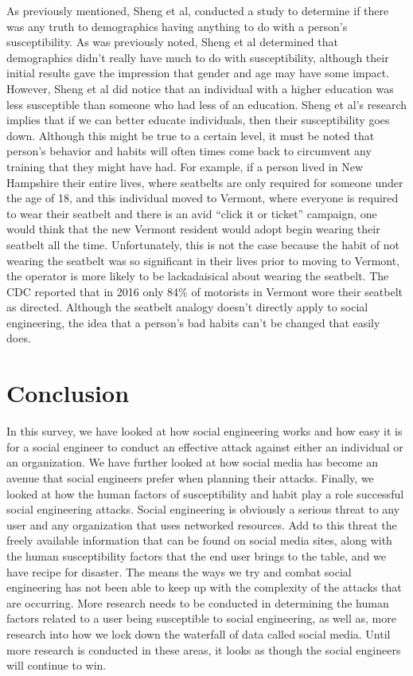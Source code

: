 \documentclass[conference]{IEEEtran}
\begin{document}
As previously mentioned, Sheng et al, conducted a study to determine if there was any truth to demographics having anything to do with a person's susceptibility. As was previously noted, Sheng et al determined that demographics didn't really have much to do with susceptibility, although their initial results gave the impression that gender and age may have some impact.  However, Sheng et al did notice that an individual with a higher education was less susceptible than someone who had less of an education. Sheng et al's research implies that if we can better educate individuals, then their susceptibility goes down.  Although this might be true to a certain level, it must be noted that person's behavior and habits will often times come back to circumvent any training that they might have had.  For example, if a person lived in New Hampshire their entire lives, where seatbelts are only required for someone under the age of 18, and this individual moved to Vermont, where everyone is required to wear their seatbelt and there is an avid “click it or ticket” campaign, one would think that the new Vermont resident would adopt begin wearing their seatbelt all the time.  Unfortunately, this is not the case because the habit of not wearing the seatbelt was so significant in their lives prior to moving to Vermont, the operator is more likely to be lackadaisical about wearing the seatbelt. The CDC reported that in 2016 only 84\% of motorists in Vermont wore their seatbelt as directed\cite{CDC}.   Although the seatbelt analogy doesn’t directly apply to social engineering, the idea that a person’s bad habits can’t be changed that easily does. 


 \section{Conclusion}
In this survey, we have looked at how social engineering works and how easy it is for a social engineer to conduct an effective attack against either an individual or an organization.  We have further looked at how social media has become an avenue that social engineers prefer when planning their attacks.  Finally, we looked at how the human factors of susceptibility and habit play a role successful social engineering attacks. 
Social engineering is obviously a serious threat to any user and any organization that uses networked resources. Add to this threat the freely available information that can be found on social media sites, along with the human susceptibility factors that the end user brings to the table, and we have recipe for disaster.  The means the ways we try and combat social engineering has not been able to keep up with the complexity of the attacks that are occurring. More research needs to be conducted in determining the human factors related to a user being susceptible to social engineering, as well as, more research into how we lock down the waterfall of data called social media. Until more research is conducted in these areas, it looks as though the social engineers will continue to win.

\nocite{*}


\end{document}
